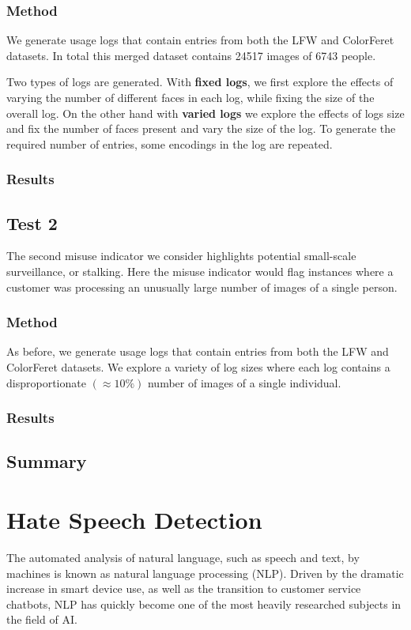 \documentclass[a4paper,12pt]{report}
\begin{document}
\subsection{Method}
We generate usage logs that contain entries from both the LFW and ColorFeret datasets. In total this merged dataset contains 24517 images of 6743 people.

Two types of logs are generated. With \textbf{fixed logs}, we first explore the effects of varying the number of different faces in each log, while fixing the size of the overall log. On the other hand with \textbf{varied logs} we explore the effects of logs size and fix the number of faces present and vary the size of the log. To generate the required number of entries, some encodings in the log are repeated.

\subsection{Results}

\section{Test 2}
The second misuse indicator we consider highlights potential small-scale surveillance, or stalking. Here the misuse indicator would flag instances where a customer was processing an unusually large number of images of a single person.

\subsection{Method}
As before, we generate usage logs that contain entries from both the LFW and ColorFeret datasets. We explore a variety of log sizes where each log contains a disproportionate $(\approx 10\%)$ number of images of a single individual. 

\subsection{Results}

\section{Summary}

\chapter{Hate Speech Detection}
The automated analysis of natural language, such as speech and text, by machines is known as natural language processing (NLP). Driven by the dramatic increase in smart device use, as well as the transition to customer service chatbots, NLP has quickly become one of the most heavily researched subjects in the field of AI. 
\end{document}
